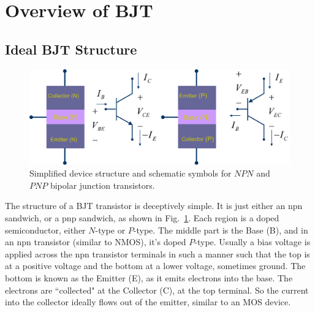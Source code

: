 \section{Overview of BJT}
\subsection{Ideal BJT Structure}
\begin{figure}[tb]
\centering
\includegraphics[width=.85\columnwidth]{slide2_bjt_overview}
\caption{Simplified device structure and schematic symbols for $NPN$ and $PNP$ bipolar junction transistors.}
\label{fig:slide2_bjt_overview}
\end{figure}
The structure of a BJT transistor is deceptively simple.  It is just either an npn sandwich, or a pnp sandwich, as shown in Fig.~\ref{fig:slide2_bjt_overview}.  Each region is a doped semiconductor, either $N$-type or $P$-type.  The middle part is the Base (B), and in an npn transistor (similar to NMOS), it's doped $P$-type.  Usually a bias voltage is applied across the npn transistor terminals in such a manner such that the top is at a positive voltage and the bottom at a lower voltage, sometimes ground.  The bottom is known as the Emitter (E), as it emits electrons into the base.  The electrons are ``collected" at the Collector (C), at the top terminal.  So the current into the collector ideally flows out of the emitter, similar to an MOS device.
